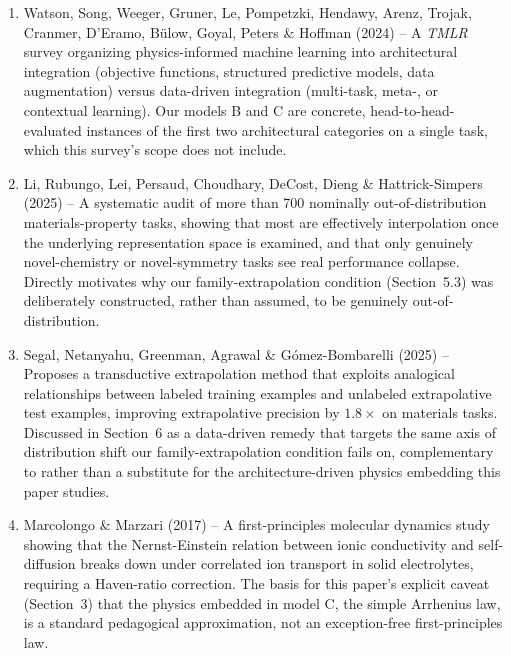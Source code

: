 \documentclass[11pt]{article}
\begin{document}
\begin{enumerate}
\item Watson, Song, Weeger, Gruner, Le, Pompetzki, Hendawy, Arenz, Trojak, Cranmer, D'Eramo, B\"ulow, Goyal, Peters \& Hoffman (2024) -- A \emph{TMLR} survey organizing physics-informed machine learning into architectural integration (objective functions, structured predictive models, data augmentation) versus data-driven integration (multi-task, meta-, or contextual learning). Our models B and C are concrete, head-to-head-evaluated instances of the first two architectural categories on a single task, which this survey's scope does not include.
\item Li, Rubungo, Lei, Persaud, Choudhary, DeCost, Dieng \& Hattrick-Simpers (2025) -- A systematic audit of more than 700 nominally out-of-distribution materials-property tasks, showing that most are effectively interpolation once the underlying representation space is examined, and that only genuinely novel-chemistry or novel-symmetry tasks see real performance collapse. Directly motivates why our family-extrapolation condition (Section~5.3) was deliberately constructed, rather than assumed, to be genuinely out-of-distribution.
\item Segal, Netanyahu, Greenman, Agrawal \& G\'omez-Bombarelli (2025) -- Proposes a transductive extrapolation method that exploits analogical relationships between labeled training examples and unlabeled extrapolative test examples, improving extrapolative precision by $1.8\times$ on materials tasks. Discussed in Section~6 as a data-driven remedy that targets the same axis of distribution shift our family-extrapolation condition fails on, complementary to rather than a substitute for the architecture-driven physics embedding this paper studies.
\item Marcolongo \& Marzari (2017) -- A first-principles molecular dynamics study showing that the Nernst-Einstein relation between ionic conductivity and self-diffusion breaks down under correlated ion transport in solid electrolytes, requiring a Haven-ratio correction. The basis for this paper's explicit caveat (Section~3) that the physics embedded in model C, the simple Arrhenius law, is a standard pedagogical approximation, not an exception-free first-principles law.
\end{enumerate}
\end{document}
